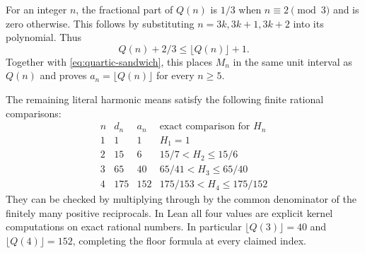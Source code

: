 For an integer $n$, the fractional part of $Q(n)$ is $1/3$ when
$n\equiv2\pmod3$ and is zero otherwise. This follows by substituting
$n=3k,3k+1,3k+2$ into its polynomial. Thus
\[
 Q(n)+2/3\le\lfloor Q(n)\rfloor+1.
\]
Together with \eqref{eq:quartic-sandwich}, this places $M_n$ in the
same unit interval as $Q(n)$ and proves $a_n=\lfloor Q(n)\rfloor$
for every $n\ge5$.

The remaining literal harmonic means satisfy the following finite rational
comparisons:
\[
\begin{array}{c|r|r|c}
n&d_n&a_n&\text{exact comparison for }H_n\\\hline
1&1&1&H_1=1\\
2&15&6&15/7<H_2\le15/6\\
3&65&40&65/41<H_3\le65/40\\
4&175&152&175/153<H_4\le175/152
\end{array}
\]
They can be checked by multiplying through by the common denominator
of the finitely many positive reciprocals. In Lean all four values
are explicit kernel computations on exact rational numbers. In particular
$\lfloor Q(3)\rfloor=40$ and $\lfloor Q(4)\rfloor=152$, completing
the floor formula at every claimed index.


